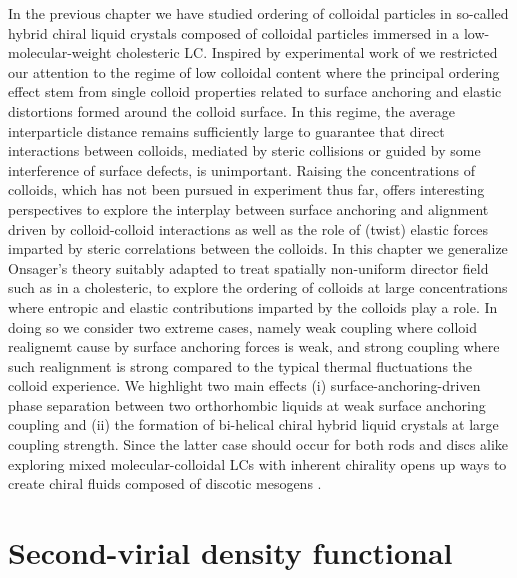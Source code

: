 In the previous chapter we have studied  ordering of colloidal particles in so-called hybrid chiral liquid crystals composed of colloidal particles immersed in a low-molecular-weight cholesteric LC. Inspired by experimental work of we restricted our attention to the regime of low colloidal content where the principal ordering effect stem from single colloid properties related to surface anchoring and elastic distortions formed around the colloid surface. In this regime,  the average interparticle distance remains sufficiently large to guarantee that direct interactions between colloids, mediated by steric collisions or guided by some interference of surface defects, is unimportant. Raising the concentrations of colloids, which has not  been pursued in experiment thus far, offers interesting perspectives to explore the interplay between surface anchoring and alignment driven by colloid-colloid interactions as well as the role of (twist) elastic forces imparted by steric correlations between the colloids. In this chapter we generalize Onsager's theory suitably adapted to treat spatially non-uniform director field such as in a cholesteric, to explore the ordering of colloids at large concentrations where entropic and elastic contributions imparted by the colloids play a role. In doing so we consider two extreme cases, namely weak coupling where colloid realignemt cause by surface anchoring forces is weak, and strong coupling where such realignment is strong compared to the typical thermal fluctuations the colloid experience.  We highlight two main effects (i) surface-anchoring-driven  phase separation between two orthorhombic liquids at weak surface anchoring coupling and (ii) the formation of bi-helical chiral hybrid liquid crystals at large coupling strength.  Since the latter case should occur for both rods and discs alike exploring mixed molecular-colloidal LCs with inherent chirality opens up ways to create chiral fluids composed of discotic mesogens \cite{bisoyi2010discotic,bushby2002discotic}.   



\section{Second-virial density functional }


